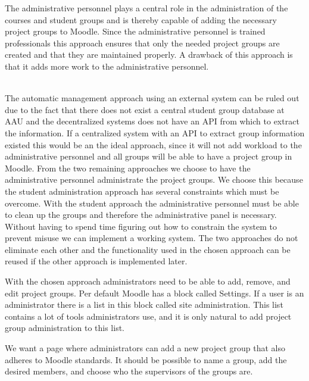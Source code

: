 The administrative personnel plays a central role in the administration of the courses and student groups and is thereby capable of adding the necessary project groups to Moodle. 
Since the administrative personnel is trained professionals this approach ensures that only the needed project groups are created and that they are maintained properly. 
A drawback of this approach is that it adds more work to the administrative personnel.

\ \\ 

The automatic management approach using an external system can be ruled out due to the fact that there does not exist a central student group database at AAU and the decentralized systems does not have an API from which to extract the information.
If a centralized system with an API to extract group information existed this would be an the ideal approach, since it will not add workload to the administrative personnel and all groups will be able to have a project group in Moodle. 
From the two remaining approaches we choose to have the administrative personnel administrate the project groups. 
We choose this because the student administration approach has several constraints which must be overcome. 
With the student approach the administrative personnel must be able to clean up the groups and therefore the administrative panel is necessary. 
Without having to spend time figuring out how to constrain the system to prevent misuse we can implement a working system.
The two approaches do not eliminate each other and the functionality used in the chosen approach can be reused if the other approach is implemented later.

With the chosen approach administrators need to be able to add, remove, and edit project groups.
Per default Moodle has a block called Settings. 
If a user is an administrator there is a list in this block called site administration. 
This list contains a lot of tools administrators use, and it is only natural to add project group administration to this list. 

We want a page where administrators can add a new project group that also adheres to Moodle standards.
It should be possible to name a group, add the desired members, and choose who the supervisors of the groups are.

